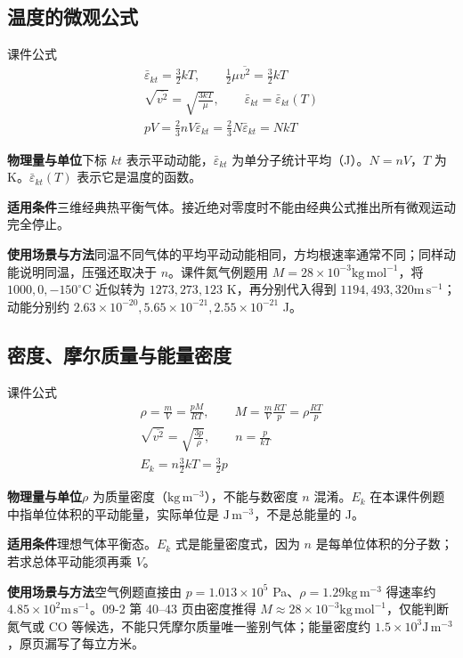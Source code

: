 \documentclass[UTF8,fontset=none,zihao=-4,a4paper]{ctexart}
\newcommand{\explain}[3]{\par\noindent\textbf{物理量与单位}\quad #1\par
\noindent\textbf{适用条件}\quad #2\par
\noindent\textbf{使用场景与方法}\quad #3\par}
\begin{document}
\par\noindent\begin{minipage}{\linewidth}
\subsection{温度的微观公式}
\begin{infobox}[breakable=false]{课件公式}
\begin{gather*}\bar\varepsilon_{kt}=\frac32kT,\qquad\frac12\mu\overline{v^2}=\frac32kT\\\sqrt{\overline{v^2}}=\sqrt{\frac{3kT}{\mu}},\qquad\bar\varepsilon_{kt}=\bar\varepsilon_{kt}(T)\\pV=\frac23nV\bar\varepsilon_{kt}=\frac23N\bar\varepsilon_{kt}=NkT\end{gather*}
\end{infobox}
\end{minipage}\par
\explain{下标 $kt$ 表示平动动能，$\bar\varepsilon_{kt}$ 为单分子统计平均（J）。$N=nV$，$T$ 为 K。$\bar\varepsilon_{kt}(T)$ 表示它是温度的函数。}{三维经典热平衡气体。接近绝对零度时不能由经典公式推出所有微观运动完全停止。}{同温不同气体的平均平动动能相同，方均根速率通常不同；同样动能说明同温，压强还取决于 $n$。课件氮气例题用 $M=28\times10^{-3}\mathrm{kg\,mol^{-1}}$，将 $1000,0,-150^\circ\mathrm C$ 近似转为 $1273,273,123$ K，再分别代入得到 $1194,493,320\mathrm{m\,s^{-1}}$；动能分别约 $2.63\times10^{-20},5.65\times10^{-21},2.55\times10^{-21}$ J。}


\par\noindent\begin{minipage}{\linewidth}
\subsection{密度、摩尔质量与能量密度}
\begin{infobox}[breakable=false]{课件公式}
\begin{gather*}\rho=\frac mV=\frac{pM}{RT},\qquad M=\frac mV\frac{RT}p=\rho\frac{RT}p\\\sqrt{\overline{v^2}}=\sqrt{\frac{3p}{\rho}},\qquad n=\frac p{kT}\\E_k=n\frac32kT=\frac32p\end{gather*}
\end{infobox}
\end{minipage}\par
\explain{$\rho$ 为质量密度（$\mathrm{kg\,m^{-3}}$），不能与数密度 $n$ 混淆。$E_k$ 在本课件例题中指单位体积的平动能量，实际单位是 $\mathrm{J\,m^{-3}}$，不是总能量的 J。}{理想气体平衡态。$E_k$ 式是能量密度式，因为 $n$ 是每单位体积的分子数；若求总体平动能须再乘 $V$。}{空气例题直接由 $p=1.013\times10^5$ Pa、$\rho=1.29\mathrm{kg\,m^{-3}}$ 得速率约 $4.85\times10^2\mathrm{m\,s^{-1}}$。09-2 第 40--43 页由密度推得 $M\approx28\times10^{-3}\mathrm{kg\,mol^{-1}}$，仅能判断氮气或 CO 等候选，不能只凭摩尔质量唯一鉴别气体；能量密度约 $1.5\times10^3\mathrm{J\,m^{-3}}$，原页漏写了每立方米。}
\end{document}
